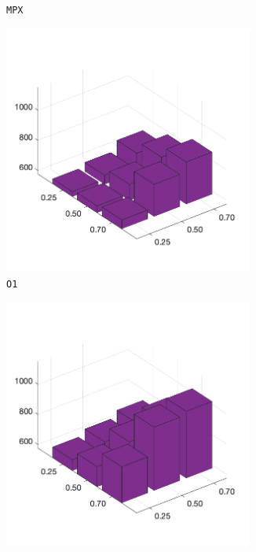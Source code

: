 \begin{figure}[H]
\begin{subfigure}[b]{0.25\textwidth}
		\caption{\texttt{MPX}}
		\label{fig:y}
    	\end{subfigure}
%
	\begin{subfigure}[b]{0.25\textwidth}
		\centering
		\includegraphics[width=0.9\textwidth]{crossover/min/cross_order_4.png}
		\caption{\texttt{O1}}
		\label{fig:z}
    	\end{subfigure}
%
	\begin{subfigure}[b]{0.25\textwidth}
		\centering
		\includegraphics[width=0.9\textwidth]{crossover/min/cross_order_based_4.png}

\end{subfigure}
\end{figure}
